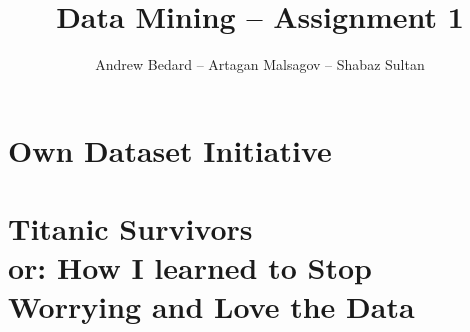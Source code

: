 \documentclass{llncs}
\title{Data Mining -- Assignment 1}
\author{Andrew Bedard -- Artagan Malsagov -- Shabaz Sultan}
\begin{document}
\maketitle
\section{Own Dataset Initiative}

\section{Titanic Survivors\\ \large or: How I learned to Stop Worrying and Love the Data}
\end{document}
